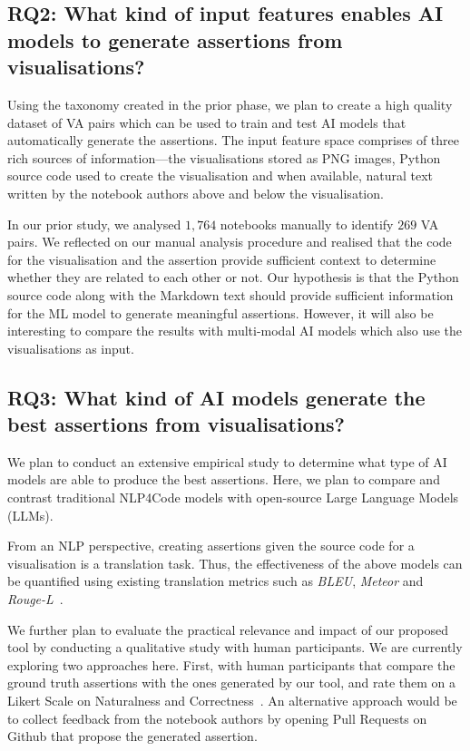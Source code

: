 \documentclass[sigconf]{acmart}
\begin{document}
\subsection{RQ2: What kind of input features enables AI models to
generate assertions from visualisations?}

Using the taxonomy created in the prior phase, we plan to create
a high quality dataset of VA pairs which can be used to train and test
AI models that automatically generate the assertions. The input
feature space comprises of three rich sources of information---the
visualisations stored as PNG images, Python source code used to create
the visualisation and when available, natural text written by the
notebook authors above and below the visualisation.

In our prior study, we analysed $1,764$ notebooks manually to identify
$269$ VA pairs. We reflected on our manual analysis procedure and
realised that the code for the visualisation and the assertion provide
sufficient context to determine whether they are related to each other
or not. Our hypothesis is that the Python source code along with the
Markdown text should provide sufficient information for the ML model
to generate meaningful assertions. However, it will also be
interesting to compare the results with multi-modal AI models which
also use the visualisations as input.

\subsection{RQ3: What kind of AI models generate the best assertions
from visualisations?}

We plan to conduct an extensive empirical study to determine what type
of AI models are able to produce the best assertions. Here, we plan to
compare and contrast traditional NLP4Code models with open-source
Large Language Models (LLMs).

From an NLP perspective, creating assertions given the source code for
a visualisation is a translation task. Thus, the effectiveness of the
above models can be quantified using existing translation metrics such
as \textit{BLEU}, \textit{Meteor} and
\textit{Rouge-L}~\cite{zhu2023revisiting}.

We further plan to evaluate the practical relevance and impact of our
proposed tool by conducting a qualitative study with human
participants. We are currently exploring two approaches here. First,
with human participants that compare the ground truth assertions with
the ones generated by our tool, and rate them on a Likert Scale on
Naturalness and Correctness~\cite{izadi2022on}. An alternative
approach would be to collect feedback from the notebook authors by
opening Pull Requests on Github that propose the generated assertion.
\end{document}
